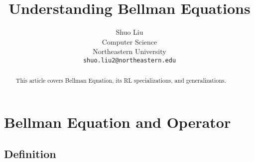 \documentclass{article} %
\title{Understanding Bellman Equations}
\author{Shuo Liu \\
Computer Science\\
Northeastern University\\
\texttt{shuo.liu2@northeastern.edu} \\
}
\begin{document}
\maketitle
\begin{abstract}
This article covers Bellman Equation, its RL specializations, and generalizations.
\end{abstract}


\section{Bellman Equation and Operator}

\subsection{Definition}
\end{document}
